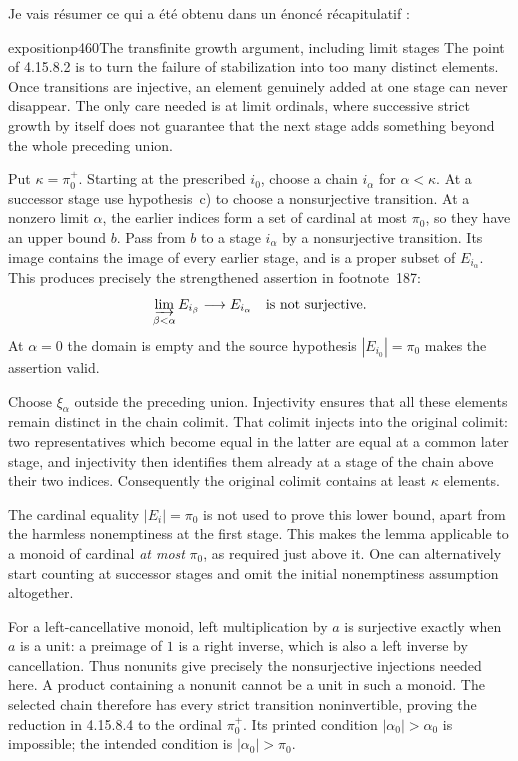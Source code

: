 Je vais résumer ce qui a été obtenu dans un énoncé récapitulatif :

\begin{dcomment}{exposition}{p460}{The transfinite growth argument, including limit stages}
The point of 4.15.8.2 is to turn the failure of stabilization into too many distinct elements. Once transitions are injective, an element genuinely added at one stage can never disappear. The only care needed is at limit ordinals, where successive strict growth by itself does not guarantee that the next stage adds something beyond the whole preceding union.

Put $\kappa=\pi_0^+$. Starting at the prescribed $i_0$, choose a chain $i_\alpha$ for $\alpha<\kappa$. At a successor stage use hypothesis~c) to choose a nonsurjective transition. At a nonzero limit $\alpha$, the earlier indices form a set of cardinal at most $\pi_0$, so they have an upper bound $b$. Pass from $b$ to a stage $i_\alpha$ by a nonsurjective transition. Its image contains the image of every earlier stage, and is a proper subset of $E_{i_\alpha}$. This produces precisely the strengthened assertion in footnote~187:
\[
\varinjlim_{\beta<\alpha}E_{i_\beta}\longrightarrow E_{i_\alpha}
\quad\hbox{is not surjective}.
\]
At $\alpha=0$ the domain is empty and the source hypothesis $|E_{i_0}|=\pi_0$ makes the assertion valid.

Choose $\xi_\alpha$ outside the preceding union. Injectivity ensures that all these elements remain distinct in the chain colimit. That colimit injects into the original colimit: two representatives which become equal in the latter are equal at a common later stage, and injectivity then identifies them already at a stage of the chain above their two indices. Consequently the original colimit contains at least $\kappa$ elements.

The cardinal equality $|E_i|=\pi_0$ is not used to prove this lower bound, apart from the harmless nonemptiness at the first stage. This makes the lemma applicable to a monoid of cardinal \emph{at most} $\pi_0$, as required just above it. One can alternatively start counting at successor stages and omit the initial nonemptiness assumption altogether.

For a left-cancellative monoid, left multiplication by $a$ is surjective exactly when $a$ is a unit: a preimage of $1$ is a right inverse, which is also a left inverse by cancellation. Thus nonunits give precisely the nonsurjective injections needed here. A product containing a nonunit cannot be a unit in such a monoid. The selected chain therefore has every strict transition noninvertible, proving the reduction in 4.15.8.4 to the ordinal $\pi_0^+$. Its printed condition $|\alpha_0|>\alpha_0$ is impossible; the intended condition is $|\alpha_0|>\pi_0$.
\end{dcomment}


